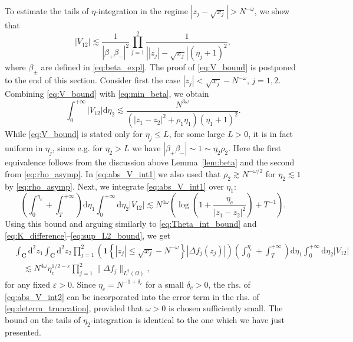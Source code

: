 \documentclass[10pt]{amsart}
\numberwithin{equation}{section}
\newcommand{\dif}{\mathrm{d}}
\newcommand{\C}{\mathbf{C}}
\begin{document}
To estimate the tails of $\eta$-integration in the regime $|z_j-\sqrt{x_j}|>N^{-\omega}$, we show that
\begin{equation}
|V_{12}| \lesssim \frac{1}{\left\vert \beta_+\beta_-\right\vert^2}\prod_{j=1}^2\frac{1}{\left\vert |z_j|-\sqrt{x_j}\right\vert(\eta_j+1)^2},
\label{eq:V_bound}
\end{equation}
where $\beta_\pm$ are defined in \eqref{eq:beta_expl}. The proof of \eqref{eq:V_bound} is postponed to the end of this section. Consider first the case $|z_j|<\sqrt{x_j}-N^{-\omega}$, $j=1,2$. Combining \eqref{eq:V_bound} with \eqref{eq:min_beta}, we obtain
\begin{equation}
\int_0^{+\infty}|V_{12}|\dif \eta_2 \lesssim \frac{N^{3\omega}}{\left(|z_1-z_2|^2+\rho_1\eta_1\right)\left(\eta_1+1\right)^2}.
\label{eq:abs_V_int1}
\end{equation}
While \eqref{eq:V_bound} is stated only for $\eta_j\le L$, for some large $L>0$, it is in fact uniform in $\eta_j$, since e.g. for $\eta_2>L$ we have $|\beta_+\beta_-|\sim 1\sim \eta_2\rho_2$. Here the first equivalence follows from the discussion above Lemma~\ref{lem:beta} and the second from \eqref{eq:rho_asymp}. In \eqref{eq:abs_V_int1} we also used that $\rho_2\gtrsim N^{-\omega/2}$ for $\eta_2\lesssim 1$ by \eqref{eq:rho_asymp}. Next, we integrate \eqref{eq:abs_V_int1} over $\eta_1$:
\begin{equation}
\left(\int_0^{\eta_c}+\int_T^{+\infty}\right)\dif \eta_1 \int_0^{+\infty}\dif\eta_2 |V_{12}|\lesssim N^{4\omega} \left(\log \left(1+\frac{\eta_c}{|z_1-z_2|^2}\right) + T^{-1}\right).
\end{equation}
Using this bound and arguing similarly to \eqref{eq:Theta_int_bound} and \eqref{eq:K_difference}--\eqref{eq:sup_L2_bound}, we get
\begin{equation}
\begin{split}
&\int_\C\dif^2 z_1\int_\C\dif^2 z_2 \prod_{j=1}^2\left(\bm{1}\left\lbrace|z_j|\le \sqrt{x_j}-N^{-\omega}\right\rbrace |\Delta f_j(z_j)|\right)\left(\int_0^{\eta_c}+\int_T^{+\infty}\right)\dif \eta_1\int_0^{+\infty}\dif\eta_2 |V_{12}|\\
&\quad\lesssim N^{4\omega}\eta_c^{1/2-\varepsilon} \prod_{j=1}^2 \|\Delta f_j\|_{L^2(\Omega)},
\end{split}
\label{eq:abs_V_int2}
\end{equation}
for any fixed $\varepsilon>0$. Since $\eta_c=N^{-1+\delta_c}$ for a small $\delta_c>0$, the rhs. of \eqref{eq:abs_V_int2} can be incorporated into the error term in the rhs. of \eqref{eq:determ_truncation}, provided that $\omega>0$ is chosen sufficiently small. The bound on the tails of $\eta_2$-integration is identical to the one which we have just presented.
\end{document}
